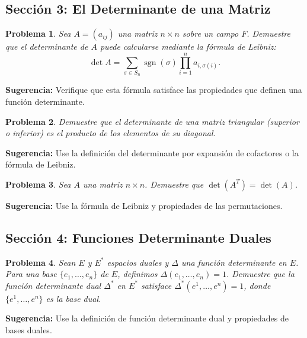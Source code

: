 \documentclass[12pt,a4paper]{article}
\newtheorem{problem}{Problema}
\newenvironment{suggestion}{\par\noindent\textbf{Sugerencia: }}{}
\begin{document}
\subsection{Sección 3: El Determinante de una Matriz}

\begin{problem}
Sea $A=(a_{ij})$ una matriz $n\times n$ sobre un campo $F$. Demuestre que el determinante de $A$ puede calcularse mediante la fórmula de Leibniz:
\[
\det A = \sum_{\sigma\in S_n} \operatorname{sgn}(\sigma) \prod_{i=1}^n a_{i,\sigma(i)}.
\]
\end{problem}
\begin{suggestion}
Verifique que esta fórmula satisface las propiedades que definen una función determinante.
\end{suggestion}

\begin{problem}
Demuestre que el determinante de una matriz triangular (superior o inferior) es el producto de los elementos de su diagonal.
\end{problem}
\begin{suggestion}
Use la definición del determinante por expansión de cofactores o la fórmula de Leibniz.
\end{suggestion}

\begin{problem}
Sea $A$ una matriz $n\times n$. Demuestre que $\det(A^T)=\det(A)$.
\end{problem}
\begin{suggestion}
Use la fórmula de Leibniz y propiedades de las permutaciones.
\end{suggestion}

\subsection{Sección 4: Funciones Determinante Duales}

\begin{problem}
Sean $E$ y $E^*$ espacios duales y $\Delta$ una función determinante en $E$. Para una base $\{e_1,\dots,e_n\}$ de $E$, definimos $\Delta(e_1,\dots,e_n)=1$. Demuestre que la función determinante dual $\Delta^*$ en $E^*$ satisface $\Delta^*(e^1,\dots,e^n)=1$, donde $\{e^1,\dots,e^n\}$ es la base dual.
\end{problem}
\begin{suggestion}
Use la definición de función determinante dual y propiedades de bases duales.
\end{suggestion}
\end{document}
